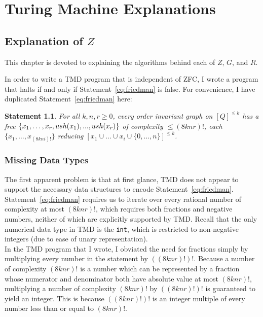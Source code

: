 \documentclass[11pt]{report}
\newtheorem{statement}{Statement}
\begin{document}
\chapter{Turing Machine Explanations}

\section{Explanation of $Z$}

This chapter is devoted to explaining the algorithms behind each of $Z$, $G$, and $R$.

In order to write a TMD program that is independent of ZFC, I wrote a program that halts if and only if Statement~\ref{eq:friedman} is false. For convenience, I have duplicated Statement~\ref{eq:friedman} here: \\

\begin{statement} \label{eq:friedman2}
For all $k, n, r \ge 0$, every order invariant graph on $[Q]^{\le k}$ has a free $\{x_1,\dots,x_r, \\
ush(x_1),...,ush(x_r)\}$ of complexity $\le (8knr)!$, each $\{x_1, \dots, x_{(8kni)!}\}$
reducing $[x_1 \cup \dots \cup x_i \cup \{0,\dots,n\}]^{\le k}$. \cite{friedman}
\end{statement}

\subsection{Missing Data Types}

The first apparent problem is that at first glance, TMD does not appear to support the necessary data structures to encode Statement~\ref{eq:friedman}. Statement~\ref{eq:friedman} requires us to iterate over every rational number of complexity at most $(8knr)!$, which requires both fractions and negative numbers, neither of which are explicitly supported by TMD. Recall that the only numerical data type in TMD is the \texttt{int}, which is restricted to non-negative integers (due to ease of unary representation).\\

In the TMD program that I wrote, I obviated the need for fractions simply by multiplying every number in the statement by $((8knr)!)!$. Because a number of complexity $(8knr)!$ is a number which can be represented by a fraction whose numerator and denominator both have absolute value at most $(8knr)!$, multiplying a number of complexity $(8knr)!$ by $((8knr)!)!$ is guaranteed to yield an integer. This is because $((8knr)!)!$ is an integer multiple of every number less than or equal to $(8knr)!$. \\
\end{document}
